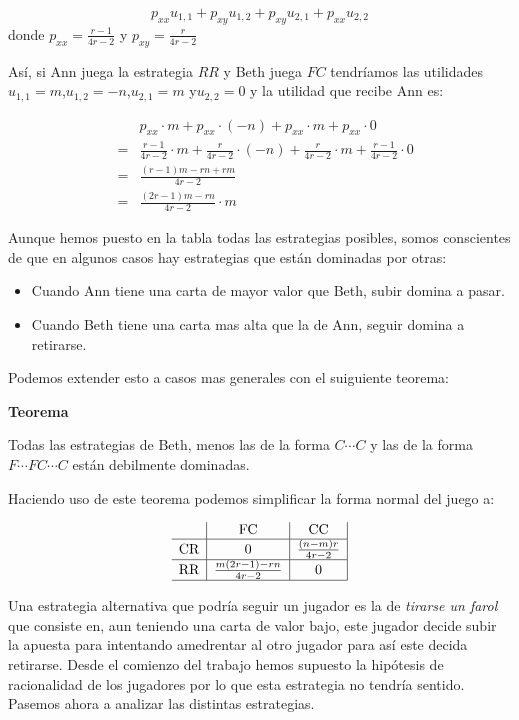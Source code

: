 \documentclass[12pt,a4paper,]{book}
\numberwithin{dummy}{section}
\theoremstyle{ocrenumbox}
\theoremstyle{blacknumex}
\theoremstyle{blacknumbox}
\theoremstyle{ocrenum}
\theoremstyle{ocrenum}
\begin{document}
\[
p_{xx}u_{1,1} + p_{xy}u_{1,2} + p_{xy}u_{2,1} + p_{xx}u_{2,2}
\] donde \(p_{xx}=\frac{r-1}{4r-2}\) y \(p_{xy}=\frac{r}{4r-2}\)

Así, si Ann juega la estrategia \(RR\) y Beth juega \(FC\) tendríamos
las utilidades \(u_{1,1}=m\),\(u_{1,2}=-n\),\(u_{2,1}=m\) y\(u_{2,2}=0\)
y la utilidad que recibe Ann es:

\[
\begin{array}{ccl}
 &  & p_{xx}·m + p_{xx}·(-n) + p_{xx}·m + p_{xx}·0 \\
        & = & \frac{r-1}{4r-2}·m +\frac{r}{4r-2}·(-n) + \frac{r}{4r-2}·m +\frac{r-1}{4r-2}·0 \\
        & = & \frac{(r-1)m - rn +rm}{4r-2} \\
        & = & \frac{(2r-1)m-rn}{4r-2}·m
\end{array}
\]

Aunque hemos puesto en la tabla todas las estrategias posibles, somos
conscientes de que en algunos casos hay estrategias que están dominadas
por otras:

\begin{itemize}
\item
  Cuando Ann tiene una carta de mayor valor que Beth, subir domina a
  pasar.
\item
  Cuando Beth tiene una carta mas alta que la de Ann, seguir domina a
  retirarse.
\end{itemize}

Podemos extender esto a casos mas generales con el suiguiente teorema:

\textbf{Teorema}

Todas las estrategias de Beth, menos las de la forma \(C \cdots C\) y
las de la forma \(F \cdots FC \cdots C\) están debilmente dominadas.

Haciendo uso de este teorema podemos simplificar la forma normal del
juego a:

\[
\begin{array}{c|c|c|}
 & \text{FC} & \text{CC} \\
\hline
\text{CR} & 0  & \frac{(n-m)r}{4r-2} \\
\hline
\text{RR} & \frac{m(2r-1)-rn}{4r-2}  & 0 \\
\hline
\end{array}
\]

Una estrategia alternativa que podría seguir un jugador es la de
\emph{tirarse un farol} que consiste en, aun teniendo una carta de valor
bajo, este jugador decide subir la apuesta para intentando amedrentar al
otro jugador para así este decida retirarse. Desde el comienzo del
trabajo hemos supuesto la hipótesis de racionalidad de los jugadores por
lo que esta estrategia no tendría sentido. Pasemos ahora a analizar las
distintas estrategias.
\end{document}
